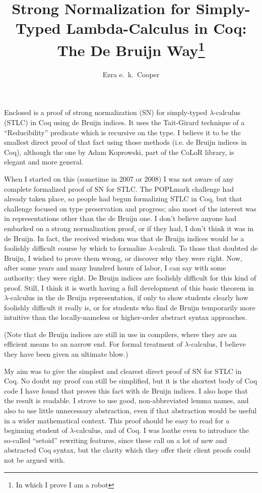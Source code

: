 \documentclass{tufte-handout}
\title{Strong Normalization for Simply-Typed Lambda-Calculus in Coq: The De Bruijn
Way\thanks{In which I prove I am a robot}}
\author{Ezra e.\ k.\ Cooper}
\begin{document}
\newcommand{\STLC}{STLC}

\maketitle

Enclosed is a proof of strong normalization (SN) for simply-typed $\lambda$-calculus (\STLC) in Coq using de Bruijn indices. It uses the Tait-Girard technique of a ``Reducibility'' predicate which is recursive on the type. I believe it to be the smallest direct proof of that fact using those methods (i.e. de Bruijn indices in Coq), although the one by Adam Koprowski, part of the CoLoR library, is elegant and more general.

When I started on this (sometime in 2007 or 2008) I was not aware of any complete formalized proof of SN for \STLC. The POPLmark challenge had already taken place, so people had begun formalizing \STLC{} in Coq, but that challenge focused on type preservation and progress; also most of the interest was in representations other than the de Bruijn one. I don't believe anyone had embarked on a strong normalization proof, or if they had, I don't think it was in de Bruijn. In fact, the received wisdom was that de Bruijn indices would be a foolishly difficult course by which to formalize $\lambda$-calculi. To those that doubted de Bruijn, I wished to prove them wrong, or discover why they were right. Now, after some years and many hundred hours of labor, I can say with some authority: they were right. De Bruijn indices are foolishly difficult for this kind of proof. Still, I think it is worth having a full development of this basic theorem in $\lambda$-calculus in the de Bruijn representation, if only to show students clearly how foolishly difficult it really is, or for students who find de Bruijn temporarily more intuitive than the locally-nameless or higher-order abstract syntax approaches.

(Note that de Bruijn indices are still in use in compilers, where they are an efficient means to an narrow end. For formal treatment of $\lambda$-calculus, I believe they have been given an ultimate blow.)

My aim was to give the simplest and clearest direct proof of SN for \STLC{} in Coq. No doubt my proof can still be simplified, but it is the shortest body of Coq code I have found that proves this fact with de Bruijn indices. I also hope that the result is readable. I strove to use good, non-abbreviated lemma names, and also to use little unnecessary abstraction, even if that abstraction would be useful in a wider mathematical context. This proof should be easy to read for a beginning student of $\lambda$-calculus, and of Coq. I was loathe even to introduce the so-called ``setoid'' rewriting features, since these call on a lot of new and abstracted Coq syntax, but the clarity which they offer their client proofs could not be argued with.
\end{document}
